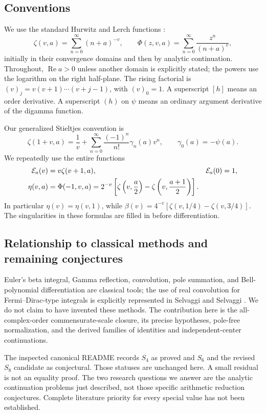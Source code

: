 \documentclass[11pt,a4paper]{article}
\numberwithin{equation}{section}
\theoremstyle{definition}\newtheorem{definition}[theorem]{Definition}
\theoremstyle{remark}\newtheorem{remark}[theorem]{Remark}
\DeclareMathOperator{\Rea}{Re}
\begin{document}
\subsection{Conventions}
We use the standard Hurwitz and Lerch functions \cite{DLMF25}:
\[
 \zeta(v,a)=\sum_{n=0}^\infty(n+a)^{-v},\qquad
 \Phi(z,v,a)=\sum_{n=0}^\infty\frac{z^n}{(n+a)^v},
\]
initially in their convergence domains and then by analytic continuation.
Throughout, $\Rea a>0$ unless another domain is explicitly stated; the
powers use the logarithm on the right half-plane. The rising factorial is
$(v)_j=v(v+1)\cdots(v+j-1)$, with $(v)_0=1$. A superscript $[h]$ means
an order derivative. A superscript $(h)$ on $\psi$ means an ordinary
argument derivative of the digamma function.

Our generalized Stieltjes convention is
\begin{equation}\label{clc:eq:stieltjes-convention}
 \zeta(1+v,a)=\frac1v+
 \sum_{n=0}^\infty\frac{(-1)^n}{n!}\gamma_n(a)v^n,
 \qquad \gamma_0(a)=-\psi(a).
\end{equation}
We repeatedly use the entire functions
\begin{align}
 \mathcal E_a(v)&=v\zeta(v+1,a),&\mathcal E_a(0)&=1,\label{clc:eq:E}\\
 \eta(v,a)&=\Phi(-1,v,a)
 =2^{-v}\left[\zeta\left(v,\frac a2\right)
                  -\zeta\left(v,\frac{a+1}2\right)\right].
 \label{clc:eq:eta}
\end{align}
In particular $\eta(v)=\eta(v,1)$, while
$\beta(v)=4^{-v}[\zeta(v,1/4)-\zeta(v,3/4)]$.
The singularities in these formulas are filled in before differentiation.

\subsection{Relationship to classical methods and remaining conjectures}
Euler's beta integral, Gamma reflection, convolution, pole summation,
and Bell-polynomial differentiation are classical tools; the use of real
convolution for Fermi--Dirac-type integrals is explicitly represented in
Selvaggi and Selvaggi \cite{SS}. We do not claim to have invented these
methods. The contribution here is the all-complex-order commensurate-scale
closure, its precise hypotheses, pole-free normalization, and the derived
families of identities and independent-center continuations.

The inspected canonical README records $S_4$ as proved and $S_6$ and the
revised $S_8$ candidate as conjectural. Those statuses are unchanged here.
A small residual is not an equality proof. The two research questions we
answer are the analytic continuation problems just described, not those
specific arithmetic reduction conjectures. Complete literature priority
for every special value has not been established.
\end{document}

